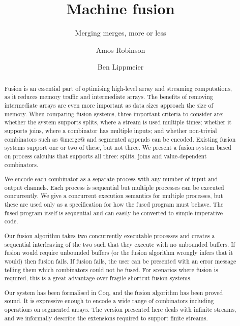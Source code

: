 \documentclass[acmlarge,review,anonymous]{acmart}\settopmatter{printfolios=true}
\begin{document}
\title{Machine fusion}
\subtitle{Merging merges, more or less}

\author{Amos Robinson}

\author{Ben Lippmeier}

\makeatactive
\begin{abstract}

Fusion is an essential part of optimising high-level array and streaming computations, as it reduces memory traffic and intermediate arrays.
The benefits of removing intermediate arrays are even more important as data sizes approach the size of memory.
When comparing fusion systems, three important criteria to consider are: whether the system supports splits, where a stream is used multiple times; whether it supports joins, where a combinator has multiple inputs; and whether non-trivial combinators such as @merge@ and segmented appends can be encoded.
Existing fusion systems support one or two of these, but not three.
We present a fusion system based on process calculus that supports all three: splits, joins and value-dependent combinators.


We encode each combinator as a separate process with any number of input and output channels.
Each process is sequential but multiple processes can be executed concurrently.
We give a concurrent execution semantics for multiple processes, but these are used only as a specification for how the fused program must behave.
The fused program itself is sequential and can easily be converted to simple imperative code.

Our fusion algorithm takes two concurrently executable processes and creates a sequential interleaving of the two such that they execute with no unbounded buffers.
If fusion would require unbounded buffers (or the fusion algorithm wrongly infers that it would) then fusion fails.
If fusion fails, the user can be presented with an error message telling them which combinators could not be fused.
For scenarios where fusion is required, this is a great advantage over fragile shortcut fusion systems.

Our system has been formalised in Coq, and the fusion algorithm has been proved sound.
It is expressive enough to encode a wide range of combinators including operations on segmented arrays.
The version presented here deals with infinite streams, and we informally describe the extensions required to support finite streams.
\end{abstract}


\maketitle













\end{document}
